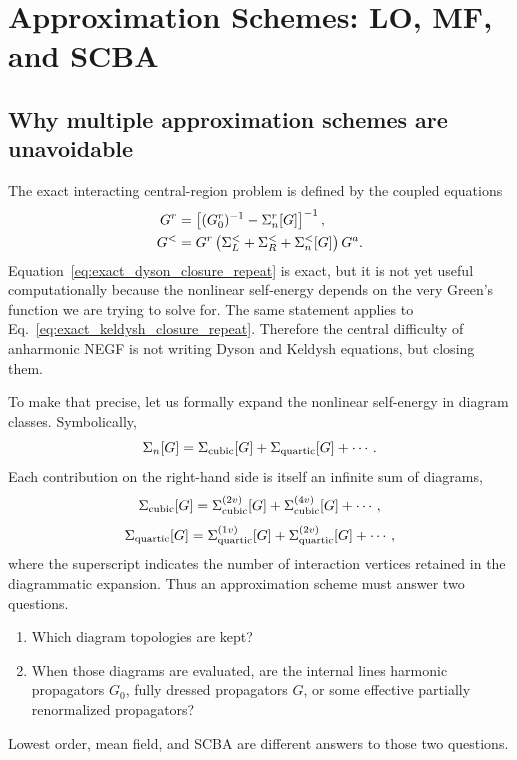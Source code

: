 \section{Approximation Schemes: LO, MF, and SCBA}

\subsection{Why multiple approximation schemes are unavoidable}
The exact interacting central-region problem is defined by the coupled equations
\begin{align}
    G^r &= \left[ (G_0^r)^{-1} - \Sigma_n^r[G] \right]^{-1},
    \label{eq:exact_dyson_closure_repeat} \\
    G^< &= G^r\left( \Sigma_L^< + \Sigma_R^< + \Sigma_n^<[G] \right)G^a.
    \label{eq:exact_keldysh_closure_repeat}
\end{align}
Equation~\eqref{eq:exact_dyson_closure_repeat} is exact, but it is not yet useful computationally because the nonlinear self-energy depends on the very Green's function we are trying to solve for. The same statement applies to Eq.~\eqref{eq:exact_keldysh_closure_repeat}. Therefore the central difficulty of anharmonic NEGF is not writing Dyson and Keldysh equations, but closing them.

To make that precise, let us formally expand the nonlinear self-energy in diagram classes. Symbolically,
\begin{equation}
    \Sigma_n[G]
    =
    \Sigma_{\rm cubic}[G] + \Sigma_{\rm quartic}[G] + \cdots.
    \label{eq:self_energy_split_by_interaction_order}
\end{equation}
Each contribution on the right-hand side is itself an infinite sum of diagrams,
\begin{equation}
    \Sigma_{\rm cubic}[G] = \Sigma_{\rm cubic}^{(2v)}[G] + \Sigma_{\rm cubic}^{(4v)}[G] + \cdots,
\end{equation}
\begin{equation}
    \Sigma_{\rm quartic}[G] = \Sigma_{\rm quartic}^{(1v)}[G] + \Sigma_{\rm quartic}^{(2v)}[G] + \cdots,
\end{equation}
where the superscript indicates the number of interaction vertices retained in the diagrammatic expansion. Thus an approximation scheme must answer two questions.
\begin{enumerate}[label=\arabic*.]
\item Which diagram topologies are kept?
\item When those diagrams are evaluated, are the internal lines harmonic propagators $G_0$, fully dressed propagators $G$, or some effective partially renormalized propagators?
\end{enumerate}
Lowest order, mean field, and SCBA are different answers to those two questions.


